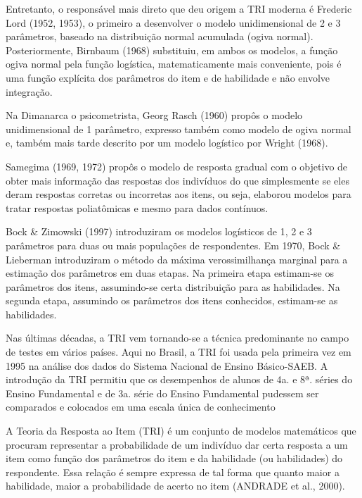 \documentclass[12pt]{article}
\begin{document}
Entretanto, o responsável mais direto que deu origem a TRI moderna é Frederic Lord (1952, 1953), o primeiro a desenvolver o modelo unidimensional de 2 e 3 parâmetros, baseado na distribuição normal acumulada (ogiva normal). Posteriormente, Birnbaum (1968) substituiu, em ambos os modelos, a função ogiva normal pela função logística, matematicamente mais conveniente, pois é uma função explícita dos parâmetros do item e de habilidade e não envolve integração.

\newpage








Na Dimanarca o psicometrista, Georg Rasch (1960) propôs o modelo unidimensional de 1 parâmetro, expresso também como modelo de ogiva normal e, também mais tarde descrito por um modelo logístico por Wright (1968). 

Samegima (1969, 1972) propôs o modelo de resposta gradual com o objetivo de obter mais informação das respostas dos indivíduos do que simplesmente se eles deram respostas corretas ou incorretas aos itens, ou seja, elaborou modelos para tratar respostas poliatômicas e mesmo para dados contínuos.

Bock \& Zimowski (1997) introduziram os modelos logísticos de 1, 2 e 3 parâmetros para duas ou mais populações de respondentes. Em 1970, Bock \& Lieberman introduziram o método da máxima verossimilhança marginal para a estimação dos parâmetros em duas etapas. Na primeira etapa estimam-se os parâmetros dos itens, assumindo-se certa distribuição para as habilidades. Na segunda etapa, assumindo os parâmetros dos itens conhecidos, estimam-se as habilidades.

Nas últimas décadas, a TRI vem tornando-se a técnica predominante no campo de testes em vários países. Aqui no Brasil, a TRI foi usada pela primeira vez em 1995 na análise dos dados do Sistema Nacional de Ensino Básico-SAEB. A introdução da TRI permitiu que os desempenhos de alunos de 4a. e 8ª. séries do Ensino Fundamental e de 3a. série do Ensino Fundamental pudessem ser comparados e colocados em uma escala única de conhecimento


A Teoria da Resposta ao Item (TRI) é um conjunto de modelos matemáticos que procuram representar a probabilidade de um indivíduo dar certa resposta a um item como função dos parâmetros do item e da habilidade (ou habilidades) do respondente. Essa relação é sempre expressa de tal forma que quanto maior a habilidade, maior a probabilidade de acerto no item (ANDRADE et al., 2000).
\end{document}
